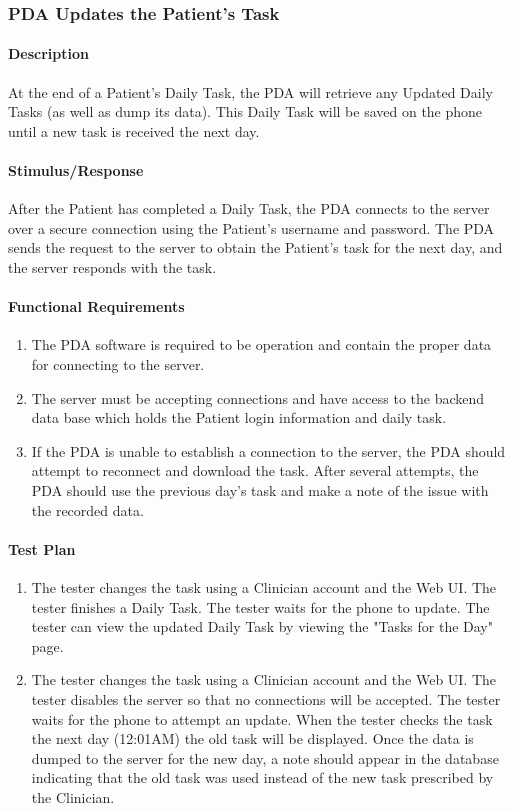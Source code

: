 \documentclass{article}
\begin{document}
\subsubsection{PDA Updates the Patient's Task}\label{sec: PDA Update Task}

\paragraph{Description}
At the end of a Patient's Daily Task, the PDA will retrieve any Updated Daily Tasks (as well as dump its data). This Daily Task will be saved on the phone until a new task is received the next day.

\paragraph{Stimulus/Response}
After the Patient has completed a Daily Task, the PDA connects to the server over a secure connection using the Patient's username and password. The PDA sends the request to the server to obtain the Patient's task for the next day, and the server responds with the task.

\paragraph{Functional Requirements}
\begin{enumerate}
\item The PDA software is required to be operation and contain the proper data for connecting to the server.
\item The server must be accepting connections and have access to the backend data base which holds the Patient login information and daily task.
\item If the PDA is unable to establish a connection to the server, the PDA should attempt to reconnect and download the task. After several attempts, the PDA should use the previous day's task and make a note of the issue with the recorded data.
\end{enumerate}

\paragraph{Test Plan}
\begin{enumerate}
\item The tester changes the task using a Clinician account and the Web UI. The tester finishes a Daily Task. The tester waits for the phone to update. The tester can view the updated Daily Task by viewing the "Tasks for the Day" page.
\item The tester changes the task using a Clinician account and the Web UI. The tester disables the server so that no connections will be accepted. The tester waits for the phone to attempt an update. When the tester checks the task the next day (12:01AM) the old task will be displayed.  Once the data is dumped to the server for the new day, a note should appear in the database indicating that the old task was used instead of the new task prescribed by the Clinician.
\end{enumerate}
\end{document}
